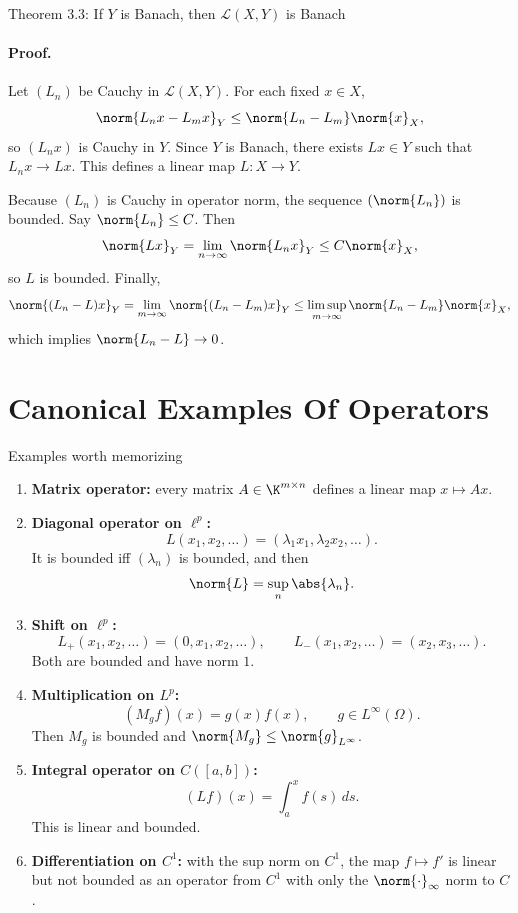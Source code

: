 \documentclass[11pt]{article}
\begin{document}
\begin{thmbox}{Theorem 3.3: If $Y$ is Banach, then $\mathcal L(X,Y)$ is Banach}
\thmDualIsBanach
\end{thmbox}

\paragraph{Proof.}
Let $(L_n)$ be Cauchy in $\mathcal L(X,Y)$. For each fixed $x\in X$,
\[
\norm{L_nx-L_mx}_Y\le \norm{L_n-L_m}\norm{x}_X,
\]
so $(L_nx)$ is Cauchy in $Y$. Since $Y$ is Banach, there exists $Lx\in Y$ such that $L_nx\to Lx$. This defines a linear map $L:X\to Y$.

Because $(L_n)$ is Cauchy in operator norm, the sequence $(\norm{L_n})$ is bounded. Say $\norm{L_n}\le C$. Then
\[
\norm{Lx}_Y=\lim_{n\to\infty}\norm{L_nx}_Y\le C\norm{x}_X,
\]
so $L$ is bounded. Finally,
\[
\norm{(L_n-L)x}_Y=\lim_{m\to\infty}\norm{(L_n-L_m)x}_Y
\le \limsup_{m\to\infty}\norm{L_n-L_m}\norm{x}_X,
\]
which implies $\norm{L_n-L}\to 0$.

\section{Canonical Examples Of Operators}

\begin{exbox}{Examples worth memorizing}
\begin{enumerate}
\item \textbf{Matrix operator:} every matrix $A\in\K^{m\times n}$ defines a linear map $x\mapsto Ax$.
\item \textbf{Diagonal operator on $\ell^p$:}
\[
L(x_1,x_2,\dots)=(\lambda_1x_1,\lambda_2x_2,\dots).
\]
It is bounded iff $(\lambda_n)$ is bounded, and then
\[
\norm{L}=\sup_n \abs{\lambda_n}.
\]
\item \textbf{Shift on $\ell^p$:}
\[
L_+(x_1,x_2,\dots)=(0,x_1,x_2,\dots),
\qquad
L_-(x_1,x_2,\dots)=(x_2,x_3,\dots).
\]
Both are bounded and have norm $1$.
\item \textbf{Multiplication on $L^p$:}
\[
(M_gf)(x)=g(x)f(x), \qquad g\in L^\infty(\Omega).
\]
Then $M_g$ is bounded and $\norm{M_g}\le \norm{g}_{L^\infty}$.
\item \textbf{Integral operator on $C([a,b])$:}
\[
(Lf)(x)=\int_a^x f(s)\,ds.
\]
This is linear and bounded.
\item \textbf{Differentiation on $C^1$:} with the sup norm on $C^1$, the map $f\mapsto f'$ is linear but not bounded as an operator from $C^1$ with only the $\norm{\cdot}_\infty$ norm to $C$.
\end{enumerate}
\end{exbox}
\end{document}
